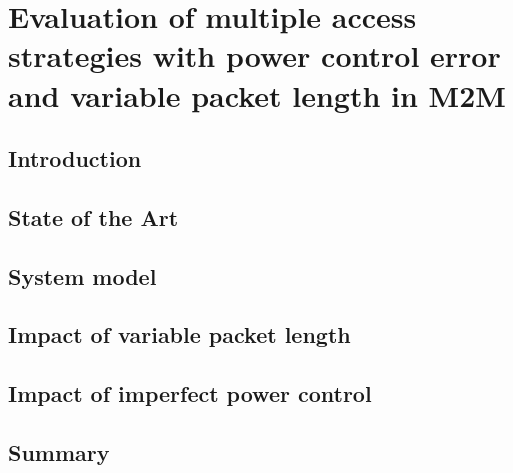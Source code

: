 \chapter{Evaluation of multiple access strategies with power control error 
and variable packet length in M2M}

\ifpdf
    \graphicspath{{Chapter3/Figs/Raster/}{Chapter3/Figs/PDF/}{Chapter3/Figs/}}
\else
    \graphicspath{{Chapter3/Figs/Vector/}{Chapter3/Figs/}}
\fi

\section{Introduction}


\section{State of the Art}

\section{System model}


\section{Impact of variable packet length}


\section{Impact of imperfect power control}


\section{Summary}




